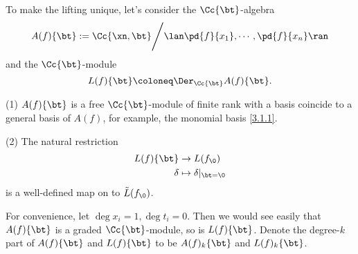   To make the lifting unique, let's consider the $\Cc\{\bt\}$-algebra
  \[A(f)\{\bt\} : = \Cc\{\xn, \bt\} \Bigg / \lan \pd{f}{x_1} , \cdots, \pd {f} {x_n} \ran\]
  and the $\Cc\{\bt\}$-module
  \[L(f)\{\bt\}\coloneq \Der_{\Cc\{\bt\}} A(f)\{\bt\} .\]
  \begin{lemma}\label{lem-4.2}
  \item[(1)] $A(f)\{\bt\}$ is a free $\Cc\{\bt\}$-module of finite rank with a basis coincide to a general basis of $A(f)$, for example, the monomial basis \eqref{3.1.1}.
  \item[(2)] The natural restriction 
    \begin{align*}
      L(f)\{\bt\} & \to L(f_\0)\\
      \delta&\mapsto \delta|_{\bt=\0}
    \end{align*}
    is a well-defined map on to $\tilde L(f_\0)$.
  \end{lemma}
  \begin{remark}
    For convenience, let $\deg x_i =1, \deg t_i=0$. Then we would  see  easily that $A(f)\{\bt\}$ is a graded $\Cc\{\bt\}$-module, so is $L(f)\{\bt\}$. Denote the degree-$k$ part of $A(f)\{\bt\}$ and $L(f)\{\bt\}$ to be $A(f)_k\{\bt\}$ and $L(f)_k\{\bt\}$.
  \end{remark}

